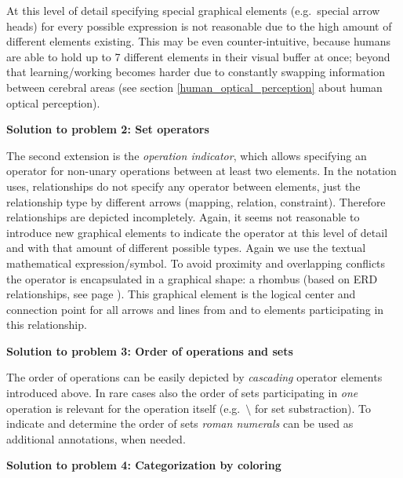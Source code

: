 \documentclass[twoside, openright, 12pt]{book}
\begin{document}
At this level of detail specifying special graphical elements (e.g.~special arrow heads) for every possible expression is not reasonable due to the high amount of different elements existing.
This may be even counter-intuitive, because humans are able to hold up to 7 different elements in their visual buffer at once; beyond that learning/working becomes harder due to constantly swapping information between cerebral areas (see section \ref{human_optical_perception} about human optical perception).

\vspace{2mm}
\noindent
\textbf{Solution to problem 2: Set operators}
\vspace{1mm}

\noindent
The second extension is the \textit{operation indicator}, which allows specifying an operator for non-unary operations between at least two elements.
In the notation \cite{Amthor18} uses, relationships do not specify any operator between elements, just the relationship type by different arrows (mapping, relation, constraint).
Therefore relationships are depicted incompletely.
Again, it seems not reasonable to introduce new graphical elements to indicate the operator at this level of detail and with that amount of different possible types.
Again we use the textual mathematical expression/symbol.
To avoid proximity and overlapping conflicts the operator is encapsulated in a graphical shape: a rhombus (based on ERD relationships, see page \pageref{fig:ERD_relationship}).
This graphical element is the logical center and connection point for all arrows and lines from and to elements participating in this relationship.


\vspace{2mm}
\noindent
\textbf{Solution to problem 3: Order of operations and sets}
\vspace{1mm}

\noindent
The order of operations can be easily depicted by \textit{cascading} operator elements introduced above.
In rare cases also the order of sets participating in \textit{one} operation is relevant for the operation itself (e.g.~$\setminus$ for set substraction).
To indicate and determine the order of sets \textit{roman numerals} can be used as additional annotations, when needed.



\vspace{4mm}
\noindent
\textbf{Solution to problem 4: Categorization by coloring}
\vspace{1mm}
\end{document}
